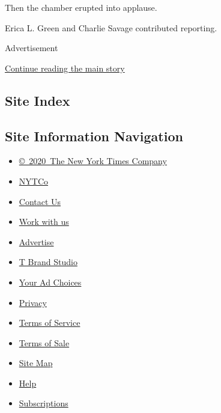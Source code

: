 Then the chamber erupted into applause.

Erica L. Green and Charlie Savage contributed reporting.

Advertisement

\protect\hyperlink{after-bottom}{Continue reading the main story}

\hypertarget{site-index}{%
\subsection{Site Index}\label{site-index}}

\hypertarget{site-information-navigation}{%
\subsection{Site Information
Navigation}\label{site-information-navigation}}

\begin{itemize}
\tightlist
\item
  \href{https://help.nytimes.com/hc/en-us/articles/115014792127-Copyright-notice}{©~2020~The
  New York Times Company}
\end{itemize}

\begin{itemize}
\tightlist
\item
  \href{https://www.nytco.com/}{NYTCo}
\item
  \href{https://help.nytimes.com/hc/en-us/articles/115015385887-Contact-Us}{Contact
  Us}
\item
  \href{https://www.nytco.com/careers/}{Work with us}
\item
  \href{https://nytmediakit.com/}{Advertise}
\item
  \href{http://www.tbrandstudio.com/}{T Brand Studio}
\item
  \href{https://www.nytimes.com/privacy/cookie-policy\#how-do-i-manage-trackers}{Your
  Ad Choices}
\item
  \href{https://www.nytimes.com/privacy}{Privacy}
\item
  \href{https://help.nytimes.com/hc/en-us/articles/115014893428-Terms-of-service}{Terms
  of Service}
\item
  \href{https://help.nytimes.com/hc/en-us/articles/115014893968-Terms-of-sale}{Terms
  of Sale}
\item
  \href{https://spiderbites.nytimes.com}{Site Map}
\item
  \href{https://help.nytimes.com/hc/en-us}{Help}
\item
  \href{https://www.nytimes.com/subscription?campaignId=37WXW}{Subscriptions}
\end{itemize}
